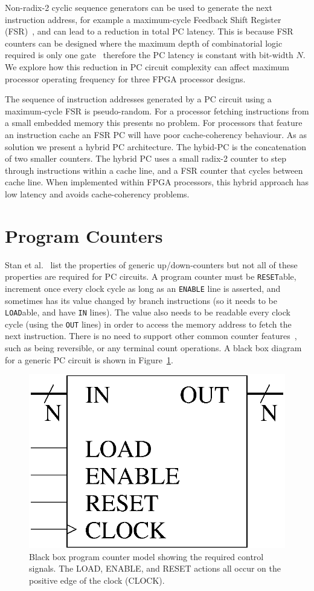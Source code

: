 \documentclass[5p, twocolumn]{elsarticle}
\begin{document}
Non-radix-2 cyclic sequence generators can be used to generate the next
instruction address, for example a maximum-cycle Feedback Shift Register
(FSR)~\cite{golomb1981srs, robshaw1995sc, menezes1997ac}, and can lead to a
reduction in total PC latency. This is because FSR counters can be designed where
the maximum depth of combinatorial logic required is only one
gate~\cite{high_performance_ring_generators} therefore the PC latency is constant
with bit-width  $N$. We explore how this reduction in PC circuit complexity can
affect maximum processor operating frequency for three FPGA processor designs.

The sequence of instruction addresses generated by a PC circuit using a
maximum-cycle FSR is pseudo-random. For a processor fetching instructions from a
small embedded memory this presents no problem. For processors that feature an
instruction cache an FSR PC will have poor cache-coherency behaviour. As as
solution we present a hybrid PC architecture. The hybid-PC is the concatenation
of two smaller counters. The hybrid PC uses a small radix-2 counter to step
through instructions within a cache line, and a FSR counter that cycles between
cache line. When implemented within FPGA processors, this hybrid approach has low
latency and avoids cache-coherency problems.

\section{Program Counters}
\label{PCs}

Stan et al.~\cite{stan1998laf} list the properties of generic up/down-counters
but not all of these properties are required for PC circuits. A program counter
must be \verb+RESET+able, increment once every clock cycle as long as an
\verb+ENABLE+ line is asserted, and sometimes has its value changed by branch
instructions (so it needs to be \verb+LOAD+able, and have \verb+IN+ lines). The
value also needs to be readable every clock cycle (using the \verb+OUT+ lines) in
order to access the memory address to fetch the next instruction. There is no
need to support other common counter features~\cite{stan1998laf}, such as being
reversible, or any terminal count operations. A black box diagram for a generic
PC circuit is shown in Figure~\ref{pc_black_box}.

\begin{figure}[ht!]
\begin{center}
\includegraphics[width=0.5\linewidth]{images/pc_black_box.eps}
\caption{Black box program counter model showing the required control signals.
The LOAD, ENABLE, and RESET actions all occur on the positive edge of the clock
(CLOCK).}
\label{pc_black_box}
\end{center}
\end{figure}
\end{document}
